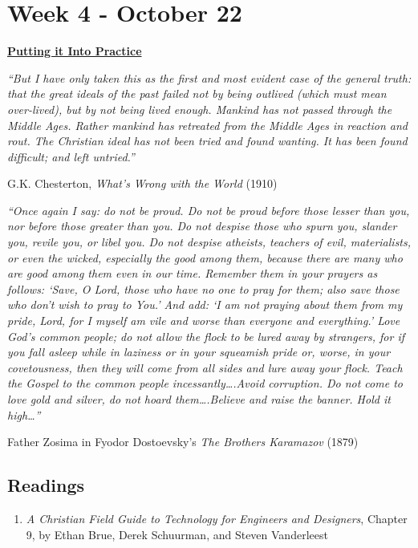 \documentclass[12pt]{article}
\let\oldsection\section
\renewcommand\section{\clearpage\oldsection}
\begin{document}
\section*{Week 4 - October 22}
\label{sec:orgbd5a6eb}
\begin{center}
\large \textbf{\uline{Putting it Into Practice}}
\end{center}

\begin{mdframed}
\emph{``But I have only taken this as the first and most evident case of the general
truth: that the great ideals of the past failed not by being outlived (which
must mean over-lived), but by not being lived enough. Mankind has not passed
through the Middle Ages. Rather mankind has retreated from the Middle Ages in
reaction and rout. The Christian ideal has not been tried and found wanting. It
has been found difficult; and left untried.''}

\hfill G.K. Chesterton, \emph{What's Wrong with the World} (1910) \newline

\noindent \emph{``Once again I say: do not be proud. Do not be proud before
those lesser than you, nor before those greater than you. Do not despise those
who spurn you, slander you, revile you, or libel you. Do not despise atheists,
teachers of evil, materialists, or even the wicked, especially the good among
them, because there are many who are good among them even in our time. Remember
them in your prayers as follows: ‘Save, O Lord, those who have no one to pray
for them; also save those who don’t wish to pray to You.’ And add: ‘I am not
praying about them from my pride, Lord, for I myself am vile and worse than
everyone and everything.’ Love God’s common people; do not allow the flock to be
lured away by strangers, for if you fall asleep while in laziness or in your
squeamish pride or, worse, in your covetousness, then they will come from all
sides and lure away your flock. Teach the Gospel to the common people
incessantly\ldots{}.Avoid corruption. Do not come to love gold and silver, do not
hoard them\ldots{}.Believe and raise the banner. Hold it high\ldots{}''}

\hfill Father Zosima in Fyodor Dostoevsky's \emph{The Brothers Karamazov} (1879)
\end{mdframed}
\subsection*{Readings}
\label{sec:org354f247}
\begin{enumerate}
\item \emph{A Christian Field Guide to Technology for Engineers and Designers}, Chapter
9, by Ethan Brue, Derek Schuurman, and Steven Vanderleest
\end{enumerate}
\end{document}
